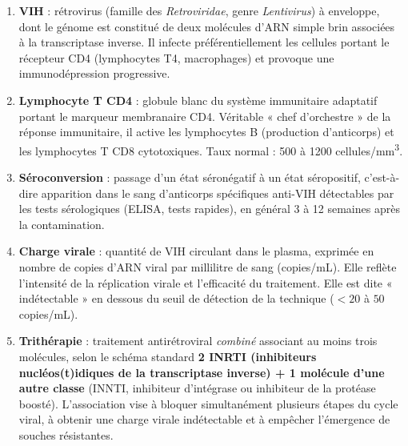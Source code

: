 \documentclass[11pt]{article}
\begin{document}
\begin{corrige}
\begin{enumerate}
    \item \textbf{VIH} : rétrovirus (famille des \emph{Retroviridae}, genre \emph{Lentivirus}) à enveloppe, dont le génome est constitué de deux molécules d'ARN simple brin associées à la transcriptase inverse. Il infecte préférentiellement les cellules portant le récepteur CD4 (lymphocytes T4, macrophages) et provoque une immunodépression progressive.
    \item \textbf{Lymphocyte T CD4} : globule blanc du système immunitaire adaptatif portant le marqueur membranaire CD4. Véritable « chef d'orchestre » de la réponse immunitaire, il active les lymphocytes B (production d'anticorps) et les lymphocytes T CD8 cytotoxiques. Taux normal : 500 à \num{1200} cellules/mm\textsuperscript{3}.
    \item \textbf{Séroconversion} : passage d'un état séronégatif à un état séropositif, c'est-à-dire apparition dans le sang d'anticorps spécifiques anti-VIH détectables par les tests sérologiques (ELISA, tests rapides), en général 3 à 12 semaines après la contamination.
    \item \textbf{Charge virale} : quantité de VIH circulant dans le plasma, exprimée en nombre de copies d'ARN viral par millilitre de sang (copies/mL). Elle reflète l'intensité de la réplication virale et l'efficacité du traitement. Elle est dite « indétectable » en dessous du seuil de détection de la technique ($< 20$ à $50$ copies/mL).
    \item \textbf{Trithérapie} : traitement antirétroviral \emph{combiné} associant au moins trois molécules, selon le schéma standard \textbf{2 INRTI (inhibiteurs nucléos(t)idiques de la transcriptase inverse) + 1 molécule d'une autre classe} (INNTI, inhibiteur d'intégrase ou inhibiteur de la protéase boosté). L'association vise à bloquer simultanément plusieurs étapes du cycle viral, à obtenir une charge virale indétectable et à empêcher l'émergence de souches résistantes.
\end{enumerate}
\end{corrige}
\end{document}

